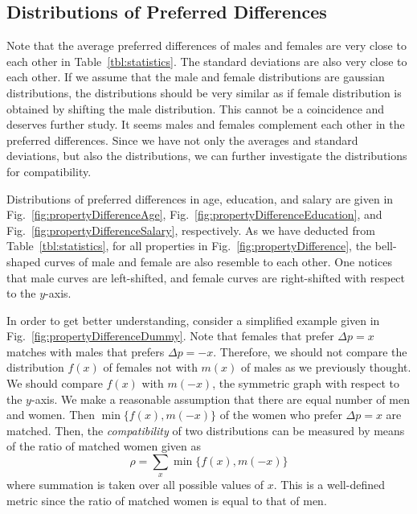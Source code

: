 \documentclass[journal,comsoc]{IEEEtran}
\newcommand{\hbIdea}[1]{{\color{red}{\scriptsize [{#1}]}}}
\newcommand{\reffig}[1]{Fig.~\ref{#1}}
\newcommand{\reftbl}[1]{Table~\ref{#1}}
\begin{document}
\subsection{Distributions of Preferred Differences}

Note that the average preferred differences of males and females are very close to each other in \reftbl{tbl:statistics}.
The standard deviations are also very close to each other.
If we assume that the male and female distributions are gaussian distributions,
the distributions should be very similar
as if female distribution is obtained by shifting the male distribution.
This cannot be a coincidence and deserves further study.
It seems males and females complement each other in the preferred differences.
Since we have not only the averages and standard deviations, 
but also the distributions,
we can further investigate the distributions for compatibility.

Distributions of preferred differences 
in age, education, and salary are given in 
\reffig{fig:propertyDifferenceAge},
\reffig{fig:propertyDifferenceEducation}, and
\reffig{fig:propertyDifferenceSalary}, respectively.
As we have deducted from \reftbl{tbl:statistics},
for all properties in \reffig{fig:propertyDifference},
the bell-shaped curves of male and female are also resemble to each other. 
One notices that
male curves are left-shifted, 
and female curves are right-shifted
with respect to the $y$-axis. 



\hbIdea{compatible} %
In order to get better understanding,
consider a simplified example given in \reffig{fig:propertyDifferenceDummy}.
Note that
females that prefer $\Delta p = x$
matches with 
males that prefers $\Delta p = -x$.
Therefore,
we should not compare the distribution $f(x)$ of females
not with $m(x)$ of males as we previously thought.
We should compare $f(x)$ with $m(-x)$,
the symmetric graph with respect to the $y$-axis.
We make a reasonable assumption that 
there are equal number of men and women.
Then
$\min\{ {f(x), m(-x)} \}$ of the women who prefer $\Delta p = x$ are matched.
Then, 
the \emph{compatibility} of two distributions can be measured by means of the ratio of matched women given as
\[
	\rho = \sum_{x} \min\{ {f(x), m(-x)} \}
\]
where summation is taken over all possible values of $x$.
This is a well-defined metric since 
the ratio of matched women is equal to that of men.
\end{document}
